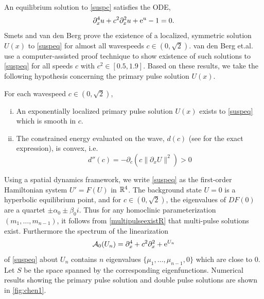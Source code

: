 \documentclass[thesis.tex]{subfiles}
\begin{document}
An equilibrium solution to \cref{suspc} satisfies the ODE,
\begin{equation}\label{suspeq}
\partial_x^4u +  c^2\partial_x^2u + \mathrm{e}^{u} - 1 = 0.
\end{equation}
Smets and van den Berg \cite[Theorem 11]{Smets2002} prove the existence of a localized, symmetric solution $U(x)$ to \cref{suspeq} for almost all wavespeeds $c \in (0, \sqrt{2})$. van den Berg et.al. \cite[Theorem~1]{Berg2018} use a computer-assisted proof technique to show existence of such solutions to \cref{suspeq} for all speeds $c$ with $c^2 \in [0.5, 1.9]$. Based on these results, we take the following hypothesis concerning the primary pulse solution $U(x)$.

\begin{hypothesis}\label{chenhyp}
For each wavespeed $c \in (0, \sqrt{2})$,
\begin{enumerate}[(i)]
\item An exponentially localized primary pulse solution $U(x)$ exists to \cref{suspeq} which is smooth in $c$.
\item The constrained energy evaluated on the wave, $d(c)$ (see \cite[Equation~(2.16)]{Grillakis1987} for the exact expression), is convex, i.e.
\begin{equation}\label{dcc}
d''(c) = -\partial_c\left( c\|\partial_xU\|^2 \right)>0
\end{equation}
\end{enumerate}
\end{hypothesis}

Using a spatial dynamics framework, we write \cref{suspeq} as the first-order Hamiltonian system $U' = F(U)$ in $\mathbb{R}^4$. The background state $U = 0$ is a hyperbolic equilibrium point, and for $c \in (0, \sqrt{2})$, the eigenvalues of $DF(0)$ are a quartet $\pm \alpha_0 \pm \beta_0 i$. Thus for any homoclinic parameterization $(m_1, \dots, m_{n-1})$, it follows from \cref{multipulseexistR} that multi-pulse solutions exist. Furthermore the spectrum of the linearization
\begin{equation}\label{suspA0}
\mathcal{A}_0(U_n) = \partial_x^4 + c^2 \partial_x^2 + \mathrm{e}^{U_n}
\end{equation}
of \cref{suspeq} about $U_n$ contains $n$ eigenvalues $\{\mu_1, \dots, \mu_{n-1}, 0\}$ which are close to 0. Let $S$ be the space spanned by the corresponding eigenfunctions. Numerical results showing the primary pulse solution and double pulse solutions are shown in \cref{fig:chen1}.
\end{document}

